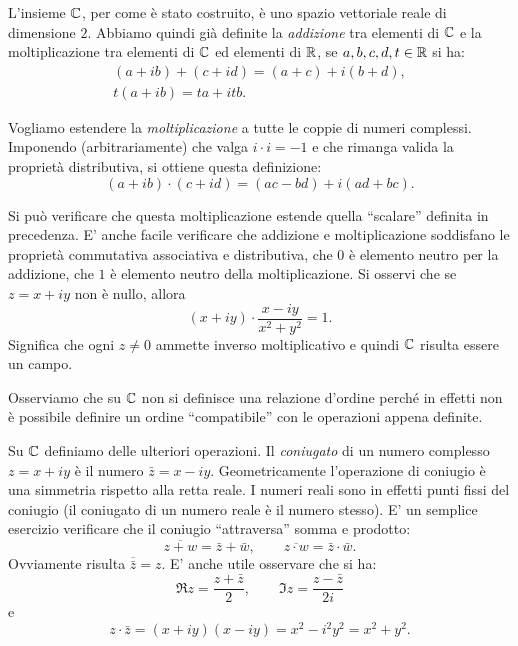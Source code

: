 L'insieme ${\mathbb C}$, per come
è stato costruito, è uno spazio vettoriale reale di dimensione $2$.
Abbiamo quindi già definite la \emph{addizione}%
%
tra elementi di ${\mathbb C}$ e la moltiplicazione
tra elementi di ${\mathbb C}$ ed elementi di ${\mathbb R}$,
se $a,b,c,d,t\in {\mathbb R}$ si ha:
\begin{gather*}
 (a+ib) + (c+id) = (a+c) + i (b+d), \\
 t(a+ib) = ta + itb.
\end{gather*}

Vogliamo estendere la \emph{moltiplicazione}%
%
 a tutte le coppie di numeri complessi.
Imponendo (arbitrariamente) che valga $i\cdot i = -1$ e che rimanga
valida la proprietà distributiva, si ottiene
questa definizione:
\[
   (a+ib) \cdot (c+id) = (ac-bd) + i(ad+bc).
\]

Si può verificare che questa moltiplicazione estende quella ``scalare'' definita
in precedenza.
E' anche facile verificare che addizione e moltiplicazione soddisfano
le proprietà commutativa associativa e distributiva,
che $0$ è elemento neutro per la addizione, che $1$ è elemento neutro
della moltiplicazione.
Si osservi che se $z=x+iy$ non è nullo, allora
\[
  (x+iy) \cdot \frac{x-iy}{x^2+y^2} = 1.
\]
Significa che ogni $z\neq 0$ ammette inverso moltiplicativo e quindi ${\mathbb C}$
risulta essere un campo.

Osserviamo che su ${\mathbb C}$ non si definisce una relazione d'ordine perché
in effetti non è possibile definire un ordine ``compatibile'' con le operazioni
appena definite.%

Su ${\mathbb C}$ definiamo delle ulteriori operazioni.
Il \emph{coniugato}%
%
%
di un numero complesso $z=x+iy$ è il numero
$\bar z = x - iy$. Geometricamente l'operazione di coniugio è una simmetria
rispetto alla retta reale. I numeri reali sono in effetti punti fissi del
coniugio (il coniugato di un numero reale è il numero stesso).
E' un semplice esercizio verificare che il coniugio ``attraversa''
somma e prodotto:
\[
\overline{z+w} = \bar z + \bar w, \qquad
\overline{z\cdot w} = \bar z \cdot \bar w.
\]
Ovviamente risulta $\overline {\bar z} = z$.
E' anche utile osservare che si ha:
\begin{equation}\label{eq:re_im}
  \Re z = \frac{z+\bar z}{2}, \qquad
  \Im z = \frac{z-\bar z}{2i}
\end{equation}
e
\[
z \cdot \bar z = (x+iy)(x-iy) = x^2-i^2y^2 = x^2+y^2.
\]

